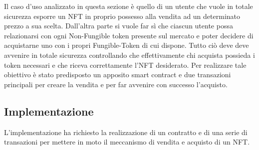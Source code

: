 Il caso d'uso analizzato in questa sezione è quello di un utente che vuole in totale sicurezza esporre un NFT in proprio possesso alla vendita ad un determinato prezzo a sua scelta. Dall'altra parte si vuole far sì che ciascun utente possa relazionarsi con ogni Non-Fungible token presente sul mercato e poter decidere di acquistarne uno con i propri Fungible-Token di cui dispone. Tutto ciò deve deve avvenire in totale sicurezza controllando che effettivamente chi acquista possieda i token necessari e che riceva correttamente l'NFT desiderato. Per realizzare tale obiettivo è stato predisposto un apposito smart contract e due transazioni principali per creare la vendita e per far avvenire con successo l'acquisto.
\subsection{Implementazione}
L'implementazione ha richiesto la realizzazione di un contratto  e di una serie di transazioni per mettere in moto il meccanismo di vendita e acquisto di un NFT.
